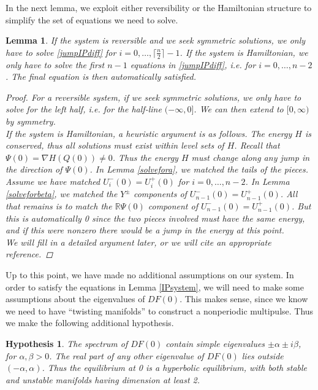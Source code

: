 \documentclass[12pt]{article}
\def\R{{\mathbb R}}
\newtheorem{lemma}{Lemma}
\newtheorem{hypothesis}{Hypothesis}
\begin{document}
In the next lemma, we exploit either reversibility or the Hamiltonian structure to simplify the set of equations we need to solve.

\begin{lemma}\label{IPsystemreduced}
If the system is reversible and we seek symmetric solutions, we only have to solve \eqref{jumpIPdiff} for $i = 0, \dots, \lceil \frac{n}{2} \rceil - 1$. If the system is Hamiltonian, we only have to solve the first $n-1$ equations in \eqref{jumpIPdiff}, i.e. for $i = 0, \dots, n-2$. The final equation is then automatically satisfied.

\begin{proof}
For a reversible system, if we seek symmetric solutions, we only have to solve for the left half, i.e. for the half-line $(-\infty, 0]$. We can then extend to $[0, \infty)$ by symmetry.\\

If the system is Hamiltonian, a heuristic argument is as follows. The energy $H$ is conserved, thus all solutions must exist within level sets of $H$. Recall that $\Psi(0) = \nabla H(Q(0)) \neq 0$. Thus the energy $H$ must change along any jump in the direction of $\Psi(0)$. In Lemma \ref{solvefora}, we matched the tails of the pieces. Assume we have matched $U_i^-(0) = U_i^+(0)$ for $i = 0, \dots, n-2$. In Lemma \ref{solveforbeta}, we matched the $Y^\pm$ components of $U_{n-1}^-(0) = U_{n-1}^+(0)$. All that remains is to match the $\R \Psi(0)$ component of $U_{n-1}^-(0) = U_{n-1}^+(0)$. But this is automatically 0 since the two pieces involved must have the same energy, and if this were nonzero there would be a jump in the energy at this point.\\

We will fill in a detailed argument later, or we will cite an appropriate reference.
\end{proof}
\end{lemma}

Up to this point, we have made no additional assumptions on our system. In order to satisfy the equations in Lemma \ref{IPsystem}, we will need to make some assumptions about the eigenvalues of $DF(0)$. This makes sense, since we know we need to have ``twisting manifolds'' to construct a nonperiodic multipulse. Thus we make the following additional hypothesis.

\begin{hypothesis}The spectrum of $DF(0)$ contain simple eigenvalues $\pm \alpha \pm i \beta$, for $\alpha, \beta > 0$. The real part of any other eigenvalue of $DF(0)$ lies outside $(-\alpha, \alpha)$. Thus the equilibrium at 0 is a hyperbolic equilibrium, with both stable and unstable manifolds having dimension at least 2.
\end{hypothesis}
\end{document}
